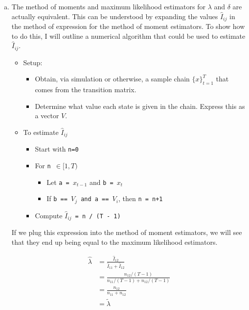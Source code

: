 \documentclass{homework}
\begin{document}
\begin{homeworkProblem}
{\begin{enumerate}[a.]
      \item The method of moments and maximum likelihood estimators for $\lambda$ and $\delta$ are actually equivalent. This can be understood by expanding the values $\hat{I}_{ij}$  in the method of expression for the method of moment estimators. To show how to do this, I will outline a numerical algorithm that could be used to estimate $\hat{I}_{ij}$.

        \begin{itemize}
          \item Setup:
            \begin{itemize}
              \item Obtain, via simulation or otherwise, a sample chain $\{x\}_{t=1}^T$ that comes from the transition matrix.
              \item Determine what value each state is given in the chain. Express this as a vector $V$.
            \end{itemize}
          \item To estimate $\hat{I}_{ij}$
            \begin{itemize}
              \item Start with \texttt{n=0}
              \item For \texttt{n $\in [1,  T)$}
                \begin{itemize}
                  \item Let \texttt{a = $x_{t-1}$} and \texttt{b = $x_t$}
                  \item If \texttt{b == $V_j$ and a == $V_i$}, then \texttt{n = n+1}
                \end{itemize}
              \item Compute \texttt{$\hat{I}_{ij} $ = n / (T - 1)}
             \end{itemize}
        \end{itemize}

        If we plug this expression into the method of moment estimators, we will see that they end up being equal to the maximum likelihood estimators.

        \begin{align*}
          \hat{\lambda} &= \frac{\hat{I}_{12}}{\hat{I}_{11}+\hat{I}_{12}}  \\
            &= \frac{n_{12} / (T - 1)}{n_{11} /  (T - 1) + n_{12}  / (T - 1)} \\
            &= \frac{n_{12}}{n_{11} + n_{12}} \\
            &= \tilde{\lambda}
        \end{align*}


\end{enumerate}}
\end{homeworkProblem}
\end{document}
